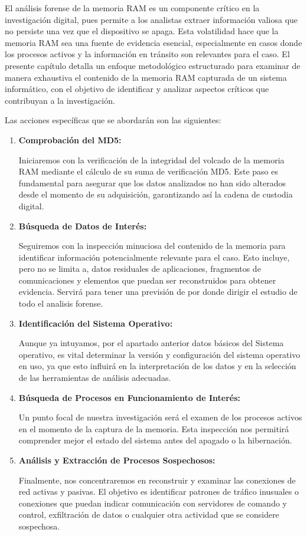 El análisis forense de la memoria RAM es un componente crítico en la investigación digital, pues permite a los analistas extraer información valiosa que no persiste una vez que el dispositivo se apaga. Esta volatilidad hace que la memoria RAM sea una fuente de evidencia esencial, especialmente en casos donde los procesos activos y la información en tránsito son relevantes para el caso. El presente capítulo detalla un enfoque metodológico estructurado para examinar de manera exhaustiva el contenido de la memoria RAM capturada de un sistema informático, con el objetivo de identificar y analizar aspectos críticos que contribuyan a la investigación.

Las acciones específicas que se abordarán son las siguientes:

\begin{enumerate}
    \item  \textbf{Comprobación del MD5:}

    Iniciaremos con la verificación de la integridad del volcado de la memoria RAM mediante el cálculo de su suma de verificación MD5. Este paso es fundamental para asegurar que los datos analizados no han sido alterados desde el momento de su adquisición, garantizando así la cadena de custodia digital.

    \item \textbf{Búsqueda de Datos de Interés:}

    Seguiremos con la inspección minuciosa del contenido de la memoria para identificar información potencialmente relevante para el caso. Esto incluye, pero no se limita a, datos residuales de aplicaciones, fragmentos de comunicaciones y elementos que puedan ser reconstruidos para obtener evidencia. Servirá para tener una previsión de por donde dirigir el estudio de todo el analisis forense.

    \item \textbf{Identificación del Sistema Operativo:}

    Aunque ya intuyamos, por el apartado anterior datos básicos del Sistema operativo, es vital determinar la versión y configuración del sistema operativo en uso, ya que esto influirá en la interpretación de los datos y en la selección de las herramientas de análisis adecuadas.

    \item \textbf{Búsqueda de Procesos en Funcionamiento de Interés:}

    Un punto focal de nuestra investigación será el examen de los procesos activos en el momento de la captura de la memoria. Esta inspección nos permitirá comprender mejor el estado del sistema antes del apagado o la hibernación.

    \item \textbf{Análisis y Extracción de Procesos Sospechosos:}

    Finalmente, nos concentraremos en reconstruir y examinar las conexiones de red activas y pasivas. El objetivo es identificar patrones de tráfico inusuales o conexiones que puedan indicar comunicación con servidores de comando y control, exfiltración de datos o cualquier otra actividad que se considere sospechosa.

\end{enumerate}

